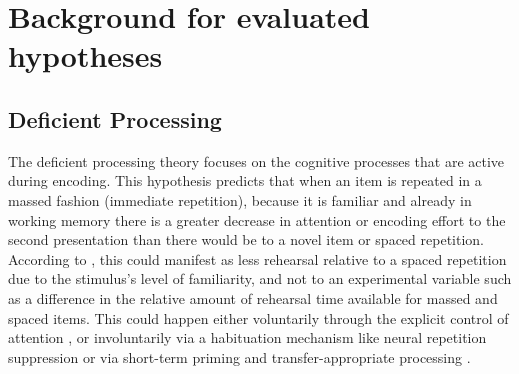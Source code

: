 
\section{Background for evaluated hypotheses}




\subsection{Deficient Processing}

The deficient processing theory focuses on the cognitive processes that are active during encoding.  This hypothesis predicts that when an item is repeated in a massed fashion (immediate repetition), because it is familiar and already in working memory there is a greater decrease in attention or encoding effort to the second presentation than there would be to a novel item or spaced repetition.  According to , this could manifest as less rehearsal relative to a spaced repetition due to the stimulus's level of familiarity, and not to an experimental variable such as a difference in the relative amount of rehearsal time available for massed and spaced items.  This could happen either voluntarily through the explicit control of attention \cite{Gree1989a}, or involuntarily via a habituation mechanism like neural repetition suppression \cite{CallSchw2010,Hint1974,VanSEtal2007,WagnEtal2000,XueEtal2011} or via short-term priming and transfer-appropriate processing \cite{Chal1993,MammEtal2002,RussEtal1998}.



